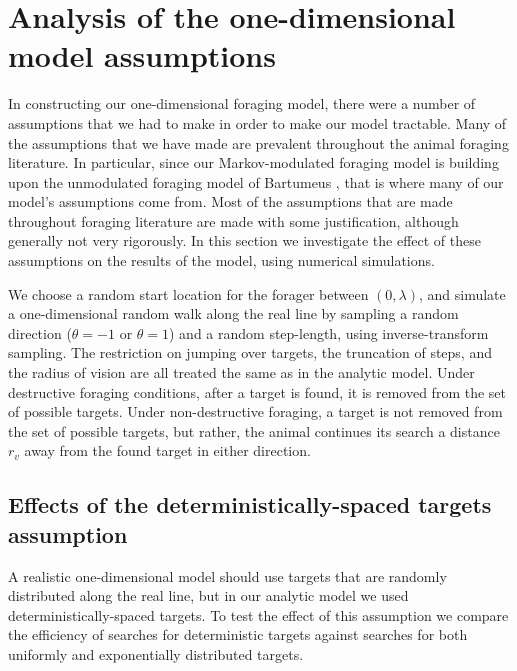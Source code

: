 \section{Analysis of the one-dimensional model assumptions\label{sec:1D_assumptions}}
In constructing our one-dimensional foraging model, there were a number of assumptions that we had to make in order to make our model tractable. Many of the assumptions that we have made are prevalent throughout the animal foraging literature. In particular, since our Markov-modulated foraging model is building upon the unmodulated foraging model of Bartumeus \etal \cite{Bartumeus_2013}, that is where many of our model's assumptions come from. Most of the assumptions that are made throughout foraging literature are made with some justification, although generally not very rigorously. In this section we investigate the effect of these assumptions on the results of the model, using numerical simulations.

We choose a random start location for the forager between $(0,\lambda)$, and simulate a one-dimensional random walk along the real line by sampling a random direction ($\theta = -1$ or $\theta = 1$) and a random step-length, using inverse-transform sampling. The restriction on jumping over targets, the truncation of steps, and the radius of vision are all treated the same as in the analytic model. Under destructive foraging conditions, after a target is found, it is removed from the set of possible targets. Under non-destructive foraging, a target is not removed from the set of possible targets, but rather, the animal continues its search a distance $r_v$ away from the found target in either direction.


\subsection{Effects of the deterministically-spaced targets assumption \label{sec:1D_assumptions:deterministic_targets}}

A realistic one-dimensional model should use targets that are randomly distributed along the real line, but in our analytic model we used deterministically-spaced targets. To test the effect of this assumption we compare the efficiency of searches for deterministic targets against searches for both uniformly and exponentially distributed targets. 

